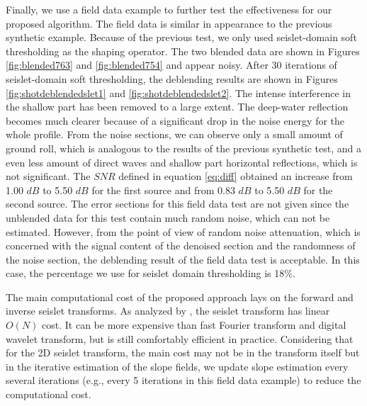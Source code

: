 Finally, we use a field data example to further test the effectiveness for our proposed algorithm. The field data is similar in appearance to the previous synthetic example. Because of the previous test, we only used seislet-domain soft thresholding as the shaping operator.
The two blended data are shown in Figures \ref{fig:blended763} and \ref{fig:blended754} and appear noisy.
 After 30 iterations of seislet-domain soft thresholding, the deblending results are shown in Figures \ref{fig:shotdeblendedslet1} and \ref{fig:shotdeblendedslet2}.  The intense interference in the shallow part has been removed to a large extent. The deep-water reflection becomes much clearer because of a significant drop in the noise energy for the whole profile. From the noise sections, we can observe only a small amount of ground roll, which is analogous to the results of the previous synthetic test, and a even less amount of direct waves and shallow part horizontal reflections, which is not significant. The $SNR$ defined in equation \ref{eq:diff} obtained an increase from 1.00 $dB$ to 5.50 $dB$ for the first source and from 0.83 $dB$ to 5.50 $dB$ for the second source. The error sections for this field data test are not given since the unblended data for this test contain much random noise, which can not be estimated.
However, from the point of view of random noise attenuation, which is concerned with the signal content of the denoised section and the randomness of the noise section, the deblending result of the field data test is acceptable. In this case, the percentage we use for seislet domain thresholding is 18\%.

The main computational cost of the proposed approach lays on the forward and inverse seislet transforms. As analyzed by \cite{seislet}, the seislet transform has linear $O(N)$ cost. It can be more expensive than fast Fourier transform and digital wavelet transform, but is still comfortably efficient in practice. Considering that for the 2D seislet transform, the main cost may not be in the transform itself but in the iterative estimation of the slope fields, we update slope estimation every several iterations (e.g., every 5 iterations in this field data example) to reduce the computational cost.

